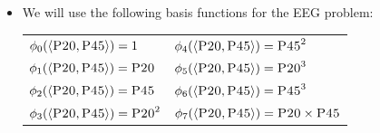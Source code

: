 \documentclass[xcolor={table}]{beamer}
\newcommand{\featN}[1]{\textsc{#1}}
\begin{document}
\begin{frame}
 \begin{itemize}
 	\item We will use the following basis functions for the EEG problem:
\begin{tabular}[ht]{ l  l  }
$\phi_0(\mathbf{\left<\featN{P20}, \featN{P45}\right>}) =  1$ & $\phi_4(\left<\featN{P20}, \featN{P45}\right>) = \featN{P45}^2$ \\
$\phi_1(\left<\featN{P20}, \featN{P45}\right>) = \featN{P20}$ & $\phi_5(\left<\featN{P20}, \featN{P45}\right>) = \featN{P20}^3$ \\
$\phi_2(\left<\featN{P20}, \featN{P45}\right>) = \featN{P45}$ &$\phi_6(\left<\featN{P20}, \featN{P45}\right>) = \featN{P45}^3$  \\
$\phi_3(\left<\featN{P20}, \featN{P45}\right>) = \featN{P20}^2$ & $\phi_7(\left<\featN{P20}, \featN{P45}\right>) = \featN{P20} \times \featN{P45}$ \\
\end{tabular}
\end{itemize}
\end{frame} 
\end{document}
